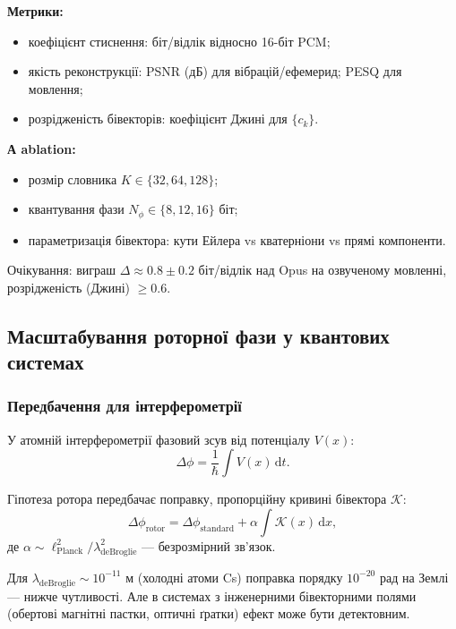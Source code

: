 \documentclass[11pt,a4paper]{article}
\theoremstyle{definition}
\theoremstyle{plain}
\theoremstyle{remark}
\begin{document}
\textbf{Метрики:}
\begin{itemize}
  \item коефіцієнт стиснення: біт/відлік відносно 16-біт PCM;
  \item якість реконструкції: PSNR (дБ) для вібрацій/ефемерид; PESQ для мовлення;
  \item розрідженість бівекторів: коефіцієнт Джині для $\{c_k\}$.
\end{itemize}

\textbf{А ablation:}
\begin{itemize}
  \item розмір словника $K \in \{32, 64, 128\}$;
  \item квантування фази $N_\phi \in \{8, 12, 16\}$ біт;
  \item параметризація бівектора: кути Ейлера vs кватерніони vs прямі компоненти.
\end{itemize}

Очікування: виграш $\Delta \approx 0.8 \pm 0.2$ біт/відлік над Opus на озвученому мовленні, розрідженість (Джині) $\ge 0.6$.

\subsection{Масштабування роторної фази у квантових системах}

\subsubsection{Передбачення для інтерферометрії}

У атомній інтерферометрії фазовий зсув від потенціалу $V(x)$:
\begin{equation}
\Delta\phi = \frac{1}{\hbar}\int V(x)\, \mathrm{d}t.
\end{equation}

Гіпотеза ротора передбачає поправку, пропорційну кривині бівектора $\mathcal{K}$:
\begin{equation}
\Delta\phi_{\text{rotor}} = \Delta\phi_{\text{standard}} + \alpha \int \mathcal{K}(x)\, \mathrm{d}x,
\end{equation}
де $\alpha \sim \ell_{\text{Planck}}^2/\lambda_{\text{deBroglie}}^2$ — безрозмірний зв’язок.

Для $\lambda_{\text{deBroglie}} \sim 10^{-11}$ м (холодні атоми Cs) поправка порядку $10^{-20}$ рад на Землі — нижче чутливості. Але в системах з інженерними бівекторними полями (обертові магнітні пастки, оптичні ґратки) ефект може бути детектовним.
\end{document}
